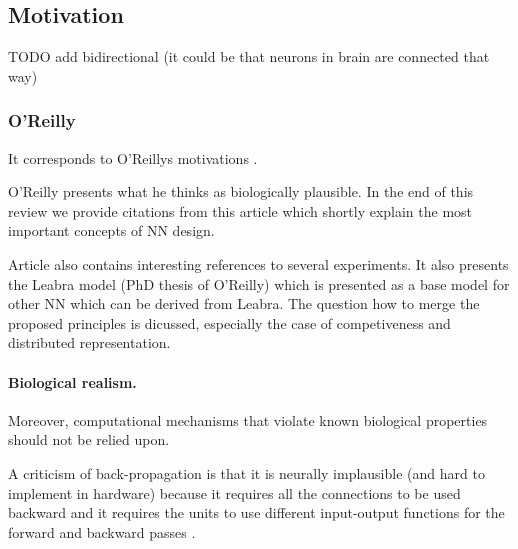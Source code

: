 




\subsection*{Motivation}
TODO add bidirectional (it could be that neurons in brain are connected that way) 

\subsubsection{O'Reilly} 
It corresponds to O'Reillys motivations \citet{o1998six}.

O'Reilly presents what he thinks as biologically plausible. In the end of this review we provide citations from this article which shortly explain the most important concepts of NN design. 

Article also contains interesting references to several experiments. It also presents the Leabra model (PhD thesis of O'Reilly) which is presented as a base model for other NN which can be derived from Leabra. The question how to merge the proposed principles is dicussed, especially the case of competiveness and distributed representation. 

\paragraph{Biological realism.} Moreover, computational mechanisms that violate
known biological properties should not be relied upon. 

A criticism of back-propagation is that it is neurally implausible (and hard to implement in hardware) because it requires all the connections to be used backward and it requires the units to use different input-output functions for the forward and backward passes \citet{hinton1988learning}.

